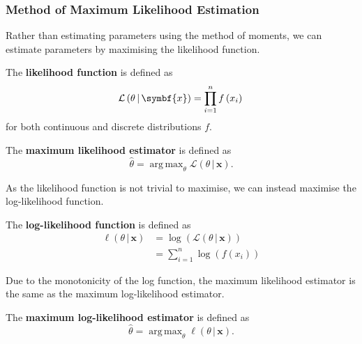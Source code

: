 \documentclass{article}
\DeclareMathOperator*{\argmax}{arg\,max}
\begin{document}
\subsubsection{Method of Maximum Likelihood Estimation}
Rather than estimating parameters using the method of moments, we can
estimate parameters by maximising the likelihood function.
\begin{definition}
    The \textbf{likelihood function} is defined as
    \begin{equation*}
        \mathcal{L}\left( \theta \,\vert\, \symbf{x} \right) = \prod_{i = 1}^n f\left( x_i \right) \\
    \end{equation*}
    for both continuous and discrete distributions \(f\).
\end{definition}
\begin{definition}
    The \textbf{maximum likelihood estimator} is defined as
    \begin{equation*}
        \hat{\theta} = \argmax_\theta{\mathcal{L}\left( \theta \,\vert\, \symbf{x} \right)}.
    \end{equation*}
\end{definition}
As the likelihood function is not trivial to maximise, we can instead
maximise the log-likelihood function.
\begin{definition}
    The \textbf{log-likelihood function} is defined as
    \begin{align*}
        \ell\left( \theta \,\vert\, \symbf{x} \right) & = \log{\left( \mathcal{L}\left( \theta \,\vert\, \symbf{x} \right) \right)} \\
                                                      & = \sum_{i = 1}^n \log{\left( f\left( x_i \right) \right)}
    \end{align*}
\end{definition}
Due to the monotonicity of the log function, the maximum likelihood
estimator is the same as the maximum log-likelihood estimator.
\begin{definition}
    The \textbf{maximum log-likelihood estimator} is defined as
    \begin{equation*}
        \hat{\theta} = \argmax_\theta{\ell\left( \theta \,\vert\, \symbf{x} \right)}.
    \end{equation*}
\end{definition}
\end{document}
